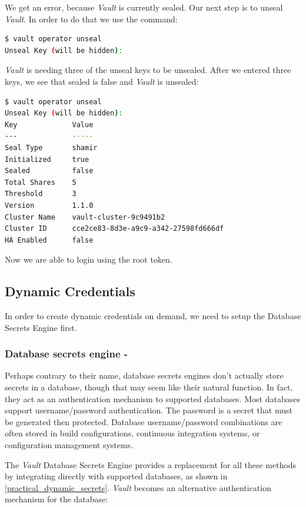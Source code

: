 \documentclass[runningheads]{llncs}
\begin{document}
We get an error, because \textit{Vault} is currently sealed. Our next step is to unseal \textit{Vault}. In order to do that we use the command: 

\begin{lstlisting}[language=bash]
$ vault operator unseal
Unseal Key (will be hidden):
\end{lstlisting}

\textit{Vault} is needing three of the unseal keys to be unsealed. After we entered three keys, we see that sealed is false and \textit{Vault} is unsealed:

\begin{lstlisting}[language=bash]
$ vault operator unseal
Unseal Key (will be hidden):
Key             Value
---             -----
Seal Type       shamir
Initialized     true
Sealed          false
Total Shares    5
Threshold       3
Version         1.1.0
Cluster Name    vault-cluster-9c9491b2
Cluster ID      cce2ce83-8d3e-a9c9-a342-27598fd666df
HA Enabled      false
\end{lstlisting}

Now we are able to login using the root token.

\subsection{Dynamic Credentials}

In order to create dynamic credentials on demand, we need to setup the Database Secrets Engine first.

\subsubsection{Database secrets engine -} Perhaps contrary to their name, database secrets engines don't actually store secrets in a database, though that may seem like their natural function. In fact, they act as an authentication mechanism to supported databases. Most databases support username/password authentication. The password is a secret that must be generated then protected. Database username/password combinations are often stored in build configurations, continuous integration systems, or configuration management systems. 

The \textit{Vault} Database Secrets Engine provides a replacement for all these methods by integrating directly with supported databases, as shown in \autoref{practical_dynamic_secrets}. \textit{Vault} becomes an alternative authentication mechanism for the database: 
\end{document}

